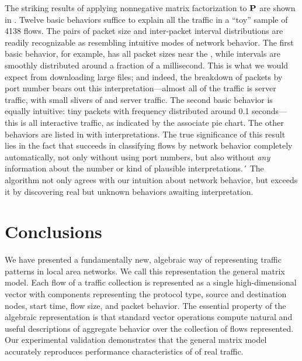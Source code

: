 \documentclass[twocolumn,final]{svjour3}
\begin{document}
The striking results of applying nonnegative matrix factorization to $\mathbf{P}$ are shown in . Twelve basic behaviors suffice to explain all the traffic in a ``toy''  sample of 4138 flows. The pairs of packet size and inter-packet interval distributions are readily recognizable as resembling intuitive modes of network behavior. The first basic behavior, for example, has all packet sizes near the , while intervals are smoothly distributed around a fraction of a millisecond. This is what we would expect from downloading large files; and indeed, the breakdown of packets by port number bears out this interpretation---almost all of the traffic is  server traffic, with small slivers of  and  server traffic. The second basic behavior is equally intuitive: tiny packets with frequency distributed around 0.1 seconds---this is all interactive  traffic, as indicated by the associate pie chart.
The other behaviors are listed in  with interpretations.
The true significance of this result lies in the fact that  succeeds in classifying flows by network behavior completely automatically, not only without using port numbers, but also without \emph{any} information about the number or kind of plausible interpretations.´
The algorithm not only agrees with our intuition about network behavior, but exceeds it by discovering real but unknown behaviors awaiting interpretation.



\section{Conclusions}\label{sec:conclusions}

We have presented a fundamentally new, algebraic way of representing traffic patterns in local area networks. We call this representation the general matrix model. Each flow of a traffic collection is represented as a single high-dimensional vector with components representing the  protocol type, source and destination nodes, start time, flow size, and packet behavior. The essential property of the algebraic representation is that standard vector operations compute natural and useful descriptions of aggregate behavior over the collection of flows represented. Our experimental validation demonstrates that the general matrix model accurately reproduces performance characteristics of of real traffic.
\end{document}
